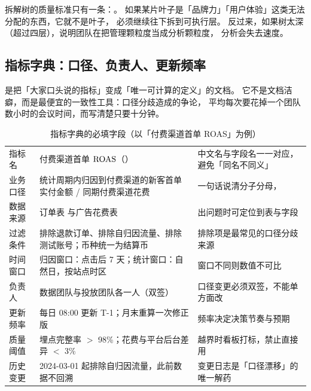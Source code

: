 拆解树的质量标准只有一条：。
如果某片叶子是「品牌力」「用户体验」这类无法分配的东西，它就不是叶子，
必须继续往下拆到可执行层。
反过来，如果树太深（超过四层），说明团队在把管理颗粒度当成分析颗粒度，
分析会失去速度。

\subsection{指标字典：口径、负责人、更新频率}

 是把「大家口头说的指标」变成「唯一可计算的定义」的文档。
它不是文档洁癖，而是最便宜的一致性工具：口径分歧造成的争论，
平均每次要花掉一个团队数小时的会议时间，而写清楚只要十分钟。

\begin{table}[htbp]
\centering
\caption{指标字典的必填字段（以「付费渠道首单 ROAS」为例）}
\label{tab:growth-dict}
\small
\begin{tabularx}{\textwidth}{L{2.3cm} L{4.3cm} Y}
\toprule
{} &  &  \\
\midrule
指标名 & 付费渠道首单 $\operatorname{ROAS}$（） & 中文名与字段名一一对应，避免「同名不同义」 \\
\addlinespace
业务口径 & 统计周期内归因到付费渠道的新客首单实付金额 / 同期付费渠道花费 & 一句话说清分子分母， \\
\addlinespace
数据来源 & 订单表  与广告花费表  & 出问题时可定位到表与字段 \\
\addlinespace
过滤条件 & 排除退款订单、排除自归因流量、排除测试账号；币种统一为结算币 & 排除项是最常见的口径分歧来源 \\
\addlinespace
时间窗口 & 归因窗口：点击后 7 天；统计窗口：自然日，按站点时区 & 窗口不同则数值不可比 \\
\addlinespace
负责人 & 数据团队与投放团队各一人（双签） & 口径变更必须双签，不能单方面改 \\
\addlinespace
更新频率 & 每日 08:00 更新 T-1；月末重算一次修正版 & 频率决定决策节奏与预期 \\
\addlinespace
质量阈值 & 埋点完整率 $>$ 98\%；花费与平台后台差异 $<$ 3\% & 越界时看板打标，禁止直接用 \\
\addlinespace
历史变更 & 2024-03-01 起排除自归因流量，此前数据不回溯 & 变更日志是「口径漂移」的唯一解药 \\
\bottomrule
\end{tabularx}
\end{table}

